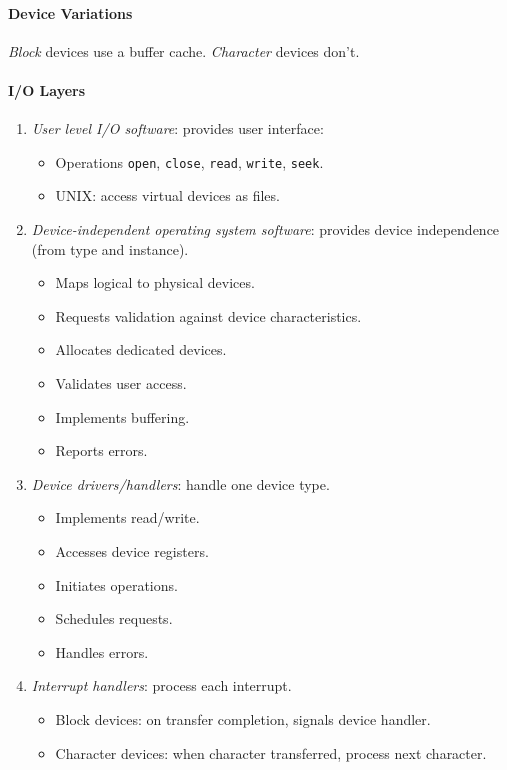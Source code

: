 \documentclass[twocolumn,english]{article}
\begin{document}
\paragraph{Device Variations}

\emph{Block} devices use a buffer cache. \emph{Character} devices
don't.

\paragraph{I/O Layers}
\begin{enumerate}
\item \emph{User level I/O software}: provides user interface:
\begin{itemize}
\item Operations \texttt{open}, \texttt{close}, \texttt{read}, \texttt{write},
\texttt{seek}.
\item UNIX: access virtual devices as files.
\end{itemize}
\item \emph{Device-independent operating system software}: provides device
independence (from type and instance).
\begin{itemize}
\item Maps logical to physical devices.
\item Requests validation against device characteristics.
\item Allocates dedicated devices.
\item Validates user access.
\item Implements buffering.
\item Reports errors.
\end{itemize}
\item \emph{Device drivers/handlers}: handle one device type.
\begin{itemize}
\item Implements read/write.
\item Accesses device registers.
\item Initiates operations.
\item Schedules requests.
\item Handles errors.
\end{itemize}
\item \emph{Interrupt handlers}: process each interrupt.
\begin{itemize}
\item Block devices: on transfer completion, signals device handler.
\item Character devices: when character transferred, process next character.
\end{itemize}
\end{enumerate}
\end{document}
